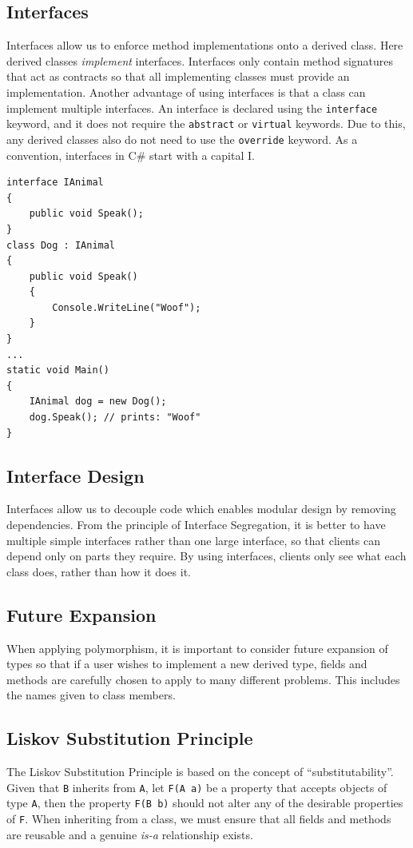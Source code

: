 \documentclass{article}
\begin{document}
\subsection{Interfaces}
Interfaces allow us to enforce method implementations onto a derived
class. Here derived classes \textit{implement} interfaces. Interfaces
only contain method signatures that act as contracts so that all
implementing classes must provide an implementation. Another advantage
of using interfaces is that a class can implement multiple interfaces.
An interface is declared using the \texttt{interface}
keyword, and it does not require the \texttt{abstract} or
\texttt{virtual} keywords. Due to this, any derived classes
also do not need to use the \texttt{override} keyword. As a
convention, interfaces in C\# start with a capital I.
\begin{verbatim}
interface IAnimal
{
    public void Speak();
}
class Dog : IAnimal
{
    public void Speak()
    {
        Console.WriteLine("Woof");
    }
}
...
static void Main()
{
    IAnimal dog = new Dog();
    dog.Speak(); // prints: "Woof"
}
\end{verbatim}
\subsection{Interface Design}
Interfaces allow us to decouple code which enables modular design by
removing dependencies. From the principle of Interface Segregation, it
is better to have multiple simple interfaces rather than one large
interface, so that clients can depend only on parts they require. By
using interfaces, clients only see what each class does, rather than
how it does it.
\subsection{Future Expansion}
When applying polymorphism, it is important to consider future
expansion of types so that if a user wishes to implement a new derived
type, fields and methods are carefully chosen to apply to many
different problems. This includes the names given to class members.
\subsection{Liskov Substitution Principle}
The Liskov Substitution Principle is based on the concept of
``substitutability''. Given that \texttt{B} inherits from
\texttt{A}, let \texttt{F(A a)} be a property
that accepts objects of type \texttt{A}, then the property
\texttt{F(B b)} should not alter any of the desirable
properties of \texttt{F}. When inheriting from a class, we
must ensure that all fields and methods are reusable and a genuine
\textit{is-a} relationship exists.
\end{document}
